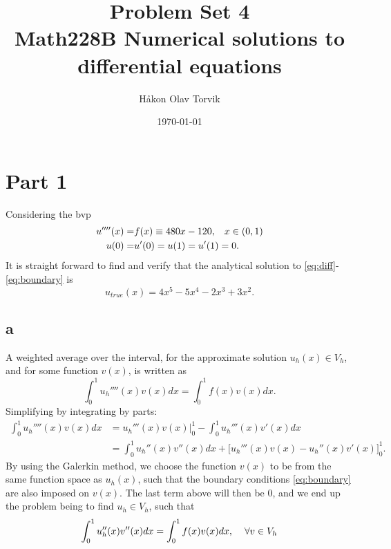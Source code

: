 \documentclass[aps, 12pt]{revtex4}
\begin{document}
\author{Håkon Olav Torvik}
\title{\Huge Problem Set 4 \\ \small Math228B Numerical solutions to differential equations}
\date{\today}


\maketitle

\section*{Part 1}
Considering the bvp
\begin{align}
    u''''(x) = & f(x) \equiv 480x - 120, \hspace{3mm} x\in(0,1) \label{eq:diff}
    \\
    u(0) =     & u'(0) = u(1) = u'(1) = 0. \label{eq:boundary}
\end{align}
It is straight forward to find and verify that the analytical solution to \eqref{eq:diff}-\eqref{eq:boundary} is
\begin{equation*}
    u_{true}(x) = 4x^5 - 5x^4 - 2x^3 + 3x^2.
\end{equation*}

\subsection*{a}
A weighted average over the interval, for the approximate solution $u_h(x)\in V_h$, and for some function $v(x)$, is written as
\begin{equation*}
    \int_0^1u_h''''(x)v(x)dx = \int_0^1f(x)v(x)dx.
\end{equation*}
Simplifying by integrating by parts:
\begin{align*}
    \int_0^1u_h''''(x)v(x)dx & =u_h'''(x)v(x) \bigg\rvert_0^1 - \int_0^1u_h'''(x)v'(x)dx
    \\
                             & = \int_0^1u_h''(x)v''(x)dx + \bigg[ u_h'''(x)v(x)- u_h''(x)v'(x)\bigg]_0^1.
\end{align*}
By using the Galerkin method, we choose the function $v(x)$ to be from the same function space as $u_h(x)$, such that the boundary conditions \eqref{eq:boundary} are also imposed on $v(x)$. The last term above will then be 0, and we end up the problem being to find $u_h\in V_h$, such that
\begin{eqnarray} \label{eq:galerkin}
    \int_0^1u_h''(x)v''(x)dx = \int_0^1f(x)v(x)dx, \hspace{4mm} \forall v\in V_h
\end{eqnarray}
\end{document}
